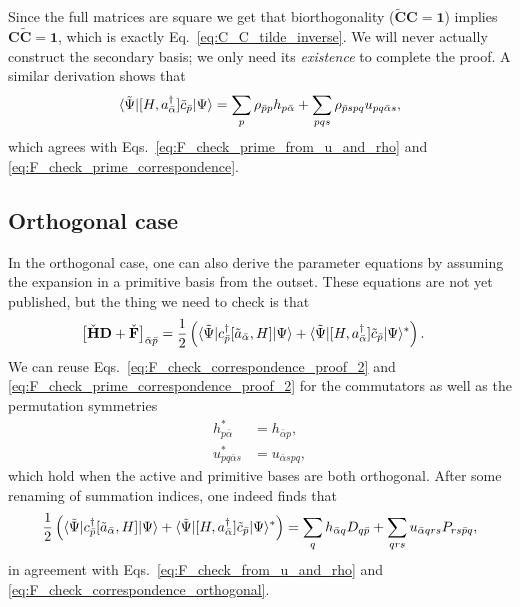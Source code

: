 \documentclass[aip,jcp,preprint,superscriptaddress,nofootinbib]{revtex4-1}
\begin{document}
Since the full matrices are square we get that biorthogonality ($\tilde{\mathbf{C}} \mathbf{C} = \mathbf{1}$)
implies $\mathbf{C}  \tilde{\mathbf{C}} = \mathbf{1}$, which is exactly Eq.~\eqref{eq:C_C_tilde_inverse}.
We will never actually construct the secondary basis; we only need its \textit{existence} to complete the proof.
A similar derivation shows that
\begin{align} \label{eq:F_check_prime_correspondence_proof_2}
    \langle \tilde{\Psi} \vert  [H, a^{\dagger}_{\bar{\alpha}}] \tilde{c}_{\bar{p}}   \vert \Psi \rangle
    = \sum_{p} \rho_{\bar{p}p} h_{p \bar{\alpha}} + \sum_{pqs} \rho_{\bar{p}spq} u_{pq\bar{\alpha}s},
\end{align}
which agrees with Eqs.~\eqref{eq:F_check_prime_from_u_and_rho} and \eqref{eq:F_check_prime_correspondence}.

\subsection{Orthogonal case}

In the orthogonal case, one can also derive the parameter equations
by assuming the expansion in a primitive basis from the outset.
These equations are not yet published, but the thing we need to check is
that
\begin{align}
    \big[ \check{\mathbf{H}} \mathbf{D} + \check{\mathbf{F}} \big]_{\bar{\alpha} \bar{p}}
    &= \frac{1}{2} \left( 
        \langle \tilde{\Psi} \vert  c^{\dagger}_{\bar{p}} [\tilde{a}_{\bar{\alpha}}, H]  \vert \Psi \rangle + 
        \langle \tilde{\Psi} \vert  [H, a^{\dagger}_{\bar{\alpha}}] \tilde{c}_{\bar{p}}  \vert \Psi \rangle^* 
    \right).
    \label{eq:F_check_correspondence_orthogonal}
\end{align}
We can reuse Eqs.~\eqref{eq:F_check_correspondence_proof_2} and \eqref{eq:F_check_prime_correspondence_proof_2}
for the commutators as well as the permutation symmetries
\begin{align}
    h_{p \bar{\alpha}}^*     &= h_{\bar{\alpha} p}, \\
    u_{p q \bar{\alpha} s}^* &= u_{\bar{\alpha} s p q},
\end{align}
which hold when the active and primitive bases are both orthogonal. After some renaming
of summation indices, one indeed finds that
\begin{align}
    \frac{1}{2} \left( 
        \langle \tilde{\Psi} \vert  c^{\dagger}_{\bar{p}} [\tilde{a}_{\bar{\alpha}}, H]  \vert \Psi \rangle + 
        \langle \tilde{\Psi} \vert  [H, a^{\dagger}_{\bar{\alpha}}] \tilde{c}_{\bar{p}}  \vert \Psi \rangle^* 
    \right)
    = \sum_{q} h_{\bar{\alpha} q} D_{q \bar{p}} + \sum_{qrs} u_{\bar{\alpha} q r s} P_{rs \bar{p} q},
\end{align}
in agreement with Eqs.~\eqref{eq:F_check_from_u_and_rho} and \eqref{eq:F_check_correspondence_orthogonal}.
\end{document}
